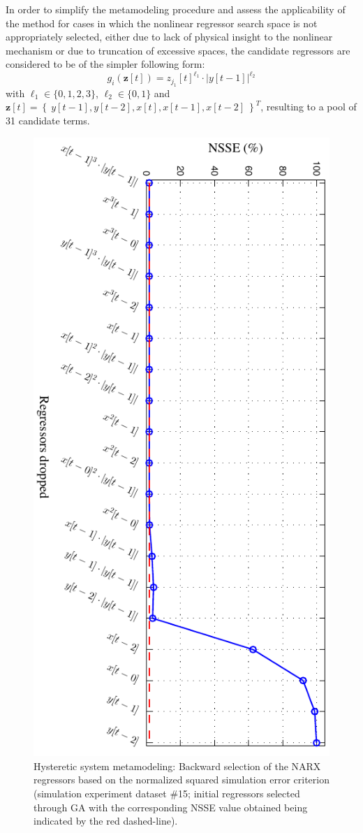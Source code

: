 \documentclass[preprint,3p,review,times,11pt]{elsarticle}
\newcommand{\bld}[1]{\boldsymbol{#1}}
\begin{document}
In order to simplify the metamodeling procedure and assess the applicability of the method for cases in which the nonlinear regressor search space is not appropriately selected, either due to lack of physical insight to the nonlinear mechanism or due to truncation of excessive spaces, the candidate regressors are considered to be of the simpler following form:
%
$$ g_i({\bld z}[t]) = z_{j_1}[t]^{\ell_1} \cdot |y[t-1]|^{\ell_2}$$
%  
with $ \ell_1 \in \{0,1,2,3\}$, $\ell_2 \in\{ 0,1 \}$ and ${\bld z}[t] = \left\{ \ y[t-1], y[t-2], x[t], x[t-1], x[t-2]\ \right\}^{T}$, resulting to a pool of 31 candidate terms.    


\begin{figure}[t!]
\begin{center}
\includegraphics[height = 1\textwidth, angle = 90]{figs/boucwen_MSS_StageA.pdf}
\caption{Hysteretic system metamodeling: Backward selection of the NARX regressors based on the normalized squared simulation error criterion (simulation experiment dataset $\#$15; initial regressors selected through GA with the corresponding NSSE value obtained being indicated by the red dashed-line).} \label{fig:boucwen_MSS_A}
\end{center}
\end{figure}
\end{document}
